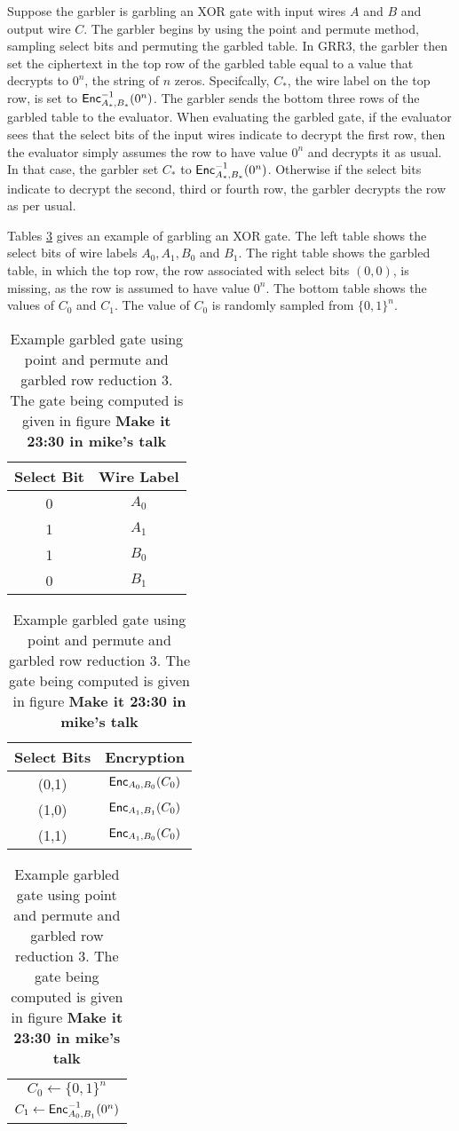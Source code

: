 Suppose the garbler is garbling an XOR gate with input wires $A$ and $B$ and output wire $C$.
The garbler begins by using the point and permute method, sampling select bits and permuting the garbled table.
In GRR3, the garbler then set the ciphertext in the top row of the garbled table equal to a value that decrypts to $0^n$, the string of $n$ zeros.
Specifcally, $C_*$, the wire label on the top row, is set to $\textsf{Enc}^{-1}_{A_*, B_*}(0^n)$.
The garbler sends the bottom three rows of the garbled table to the evaluator.
When evaluating the garbled gate, if the evaluator sees that the select bits of the input wires indicate to decrypt the first row, then the evaluator simply assumes the row to have value $0^n$ and decrypts it as usual.
In that case, the garbler set $C_*$ to $\textsf{Enc}^{-1}_{A_*, B_*}(0^n)$.
Otherwise if the select bits indicate to decrypt the second, third or fourth row, the garbler decrypts the row as per usual.

Tables \ref{tbl:grr3} gives an example of garbling an XOR gate.
The left table shows the select bits of wire labels $A_0, A_1, B_0$ and $B_1$.
The right table shows the garbled table, in which the top row, the row associated with select bits $(0,0)$, is missing, as the row is assumed to have value $0^n$.
The bottom table shows the values of $C_0$ and $C_1$.
The value of $C_0$ is randomly sampled from $\{0,1\}^n$.

\begin{table}
    \centering
    \begin{tabular}{|c|c|}
        \hline
        Select Bit & Wire Label \\
        \hline
        0 & $A_0$ \\
        1 & $A_1$ \\
        1 & $B_0$ \\
        0 & $B_1$ \\
        \hline
    \end{tabular}
    \qquad
    \begin{tabular}{|c|c|}
        \hline
        Select Bits & Encryption \\
        \hline
        (0,1) & $\textsf{Enc}_{A_0, B_0}(C_0)$ \\
        (1,0) & $\textsf{Enc}_{A_1, B_1}(C_0)$ \\
        (1,1) & $\textsf{Enc}_{A_1, B_0}(C_0)$ \\
        \hline
    \end{tabular}
    \qquad
    \begin{tabular}{|c|}
        \hline
        $C_0 \gets \{0,1\}^n$ \\
        $C_1 \gets \textsf{Enc}_{A_0, B_1}^{-1}(0^n)$ \\
        \hline
    \end{tabular}
    \caption{Example garbled gate using point and permute and garbled row reduction 3. The gate being computed is given in figure \textbf{Make it 23:30 in mike's talk}}
    \label{tbl:grr3}
\end{table}

